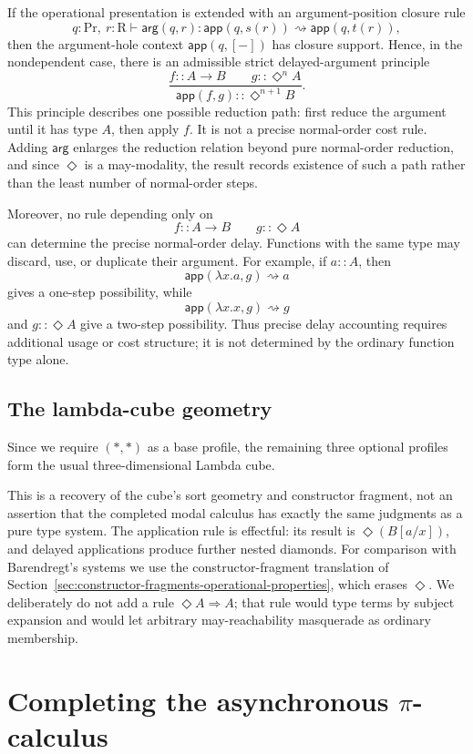\documentclass[11pt]{article}
\newcommand{\Proc}{\mathrm{Pr}}
\newcommand{\Rew}{\mathrm{R}}
\newcommand{\rw}{\rightsquigarrow}
\newcommand{\app}{\mathsf{app}}
\newcommand{\Dia}{\Diamond}
\newcommand{\hole}{[-]}
\begin{document}
If the operational presentation is extended with an argument-position
closure rule
\[
  q:\Proc,\ r:\Rew
  \vdash
  \mathsf{arg}(q,r):
  \app(q,s(r))\rw \app(q,t(r)),
\]
then the argument-hole context \(\app(q,\hole)\) has closure support.  Hence,
in the nondependent case, there is an admissible strict delayed-argument
principle
\[
  \frac{
    f::A\to B
    \qquad
    g::\Dia^n A
  }{
    \app(f,g)::\Dia^{n+1}B
  }.
\]
This principle describes one possible reduction path: first reduce the
argument until it has type \(A\), then apply \(f\).  It is not a precise
normal-order cost rule.  Adding \(\mathsf{arg}\) enlarges the reduction
relation beyond pure normal-order reduction, and since \(\Dia\) is a
may-modality, the result records existence of such a path rather than the
least number of normal-order steps.

Moreover, no rule depending only on
\[
  f::A\to B
  \qquad
  g::\Dia A
\]
can determine the precise normal-order delay.  Functions with the same type
may discard, use, or duplicate their argument.  For example, if \(a::A\),
then
\[
  \app(\lambda x.a,g)\rw a
\]
gives a one-step possibility, while
\[
  \app(\lambda x.x,g)\rw g
\]
and \(g::\Dia A\) give a two-step possibility.  Thus precise delay accounting
requires additional usage or cost structure; it is not determined by the
ordinary function type alone.

\subsection{The lambda-cube geometry}

Since we require \((\ast,\ast)\) as a base profile, the remaining three optional profiles form the usual three-dimensional Lambda cube.

This is a recovery of the cube's sort geometry and constructor fragment, not an assertion that the completed modal calculus has exactly the same judgments as a pure type system.  The application rule is effectful: its result is \(\Dia(B[a/x])\), and delayed applications produce further nested diamonds. For comparison with Barendregt's systems we use the constructor-fragment translation of Section~\ref{sec:constructor-fragments-operational-properties}, which erases \(\Dia\).  We deliberately do not add a rule \(\Dia A\Rightarrow A\); that rule would type terms by subject expansion and would let arbitrary may-reachability masquerade as ordinary membership.

\section{Completing the asynchronous \texorpdfstring{$\pi$}{π}-calculus}
\end{document}

